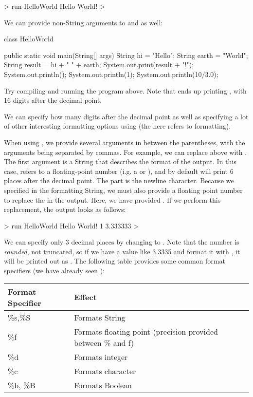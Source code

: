 \begin{code}
> run HelloWorld
Hello	    World!
>
\end{code}

We can provide non-String arguments to  and  as well:
\begin{code}
class HelloWorld {

    public static void main(String[] args) {
        String hi = "Hello";
        String earth = "World";
        String result = hi + " " + earth;
        System.out.print(result + "!");
        System.out.println();
        System.out.println(1);
        System.out.println(10/3.0);
    }

}
\end{code}
Try compiling and running the program above.
Note that  ends up printing
, with 16 digits after the decimal point.

We can specify how many digits after the decimal point as well
as specifying a lot of other interesting formatting options
using  (the  here refers to formatting).

When using , we provide several arguments
in between the parentheses, with the arguments being separated by
commas.
For example, we can replace  above
with .
The first argument  is a String that describes the format of the output.
In this case,  refers to a floating-point number (i.g. a  or ),
and by default will print 6 places after the decimal point.
The  part is the newline character.
Because we specified  in the formatting String, we must also provide
a floating point number to replace the  in the output. Here,
we have provided .
If we perform this replacement, the output looks as follows:
\begin{code}
> run HelloWorld
Hello World!
1
3.333333
> 
\end{code}

We can specify only 3 decimal places by changing  to .
Note that the number is \emph{rounded}, not truncated, so if we have a value like
3.3335 and format it with , it will be printed out as .
The following table provides some common format specifiers (we have already seen
):

\begin{tabular}{|l|l|}
\hline
Format Specifier & Effect\\
\hline
\%s,\%S & Formats String\\
\%f & Formats floating point (precision provided between \% and f)\\
\%d & Formats integer\\
\%c & Formats character\\
\%b, \%B & Formats Boolean\\
\hline
\end{tabular}

